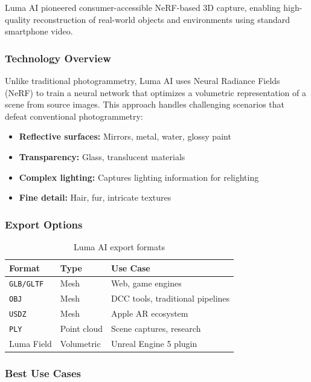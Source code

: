 \documentclass[11pt]{article}
\newcommand{\fileformat}[1]{\texttt{#1}}
\begin{document}
Luma AI pioneered consumer-accessible NeRF-based 3D capture, enabling high-quality reconstruction of real-world objects and environments using standard smartphone video.

\subsubsection{Technology Overview}

Unlike traditional photogrammetry, Luma AI uses Neural Radiance Fields (NeRF) to train a neural network that optimizes a volumetric representation of a scene from source images. This approach handles challenging scenarios that defeat conventional photogrammetry:

\begin{itemize}[leftmargin=2em]
  \item \textbf{Reflective surfaces:} Mirrors, metal, water, glossy paint
  \item \textbf{Transparency:} Glass, translucent materials
  \item \textbf{Complex lighting:} Captures lighting information for relighting
  \item \textbf{Fine detail:} Hair, fur, intricate textures
\end{itemize}

\subsubsection{Export Options}

\begin{table}[H]
\centering
\small
\begin{tabular}{@{}l l l@{}}
\toprule
\textbf{Format} & \textbf{Type} & \textbf{Use Case} \\
\midrule
\fileformat{GLB/GLTF} & Mesh & Web, game engines \\
\fileformat{OBJ} & Mesh & DCC tools, traditional pipelines \\
\fileformat{USDZ} & Mesh & Apple AR ecosystem \\
\fileformat{PLY} & Point cloud & Scene captures, research \\
Luma Field & Volumetric & Unreal Engine 5 plugin \\
\bottomrule
\end{tabular}
\caption{Luma AI export formats}
\label{tab:luma-formats}
\end{table}

\subsubsection{Best Use Cases}
\end{document}

